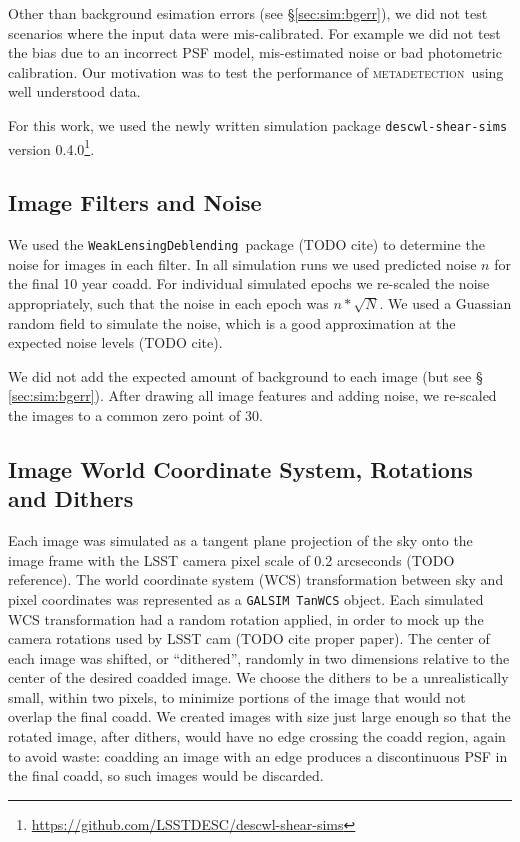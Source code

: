 \documentclass[iop, twocolappendix, appendixfloats, numberedappendix, apj]{hackemulateapj}
\newcommand{\descwl}{\texttt{WeakLensingDeblending}}
\newcommand{\galsim}{\texttt{GALSIM}}
\newcommand{\mdet}{\textsc{metadetection}}
\begin{document}
Other than background esimation errors (see \S \ref{sec:sim:bgerr}), we did not
test scenarios where the input data were mis-calibrated.  For example we did
not test the bias due to an incorrect PSF model, mis-estimated noise or bad
photometric calibration.  Our motivation was to test the performance of \mdet\
using well understood data.

For this work, we used the newly written simulation package
\texttt{descwl-shear-sims} version
0.4.0\footnote{\url{https://github.com/LSSTDESC/descwl-shear-sims}}.

\subsection{Image Filters and Noise} \label{sec:sim:noise}

We used the \descwl\ package (TODO cite) to determine the
noise for images in each filter.  In all simulation runs we used predicted
noise $n$ for the final 10 year coadd.  For individual simulated epochs we
re-scaled the noise appropriately, such that the noise in each epoch was $n *
\sqrt{N}$.  We used a Guassian random field to simulate the noise, which is a
good approximation at the expected noise levels (TODO cite).

We did not add the expected amount of background to each image (but see \S
\ref{sec:sim:bgerr}).  After drawing all image features and adding
noise, we re-scaled the images to a common zero point of 30.

\subsection{Image World Coordinate System, Rotations and Dithers} \label{sec:sim:rotdith}

Each image was simulated as a tangent plane projection of the sky onto the
image frame with the LSST camera pixel scale of 0.2 arcseconds (TODO reference).
The world coordinate system (WCS) transformation between sky and pixel
coordinates was represented as a \galsim\ \texttt{TanWCS} object.  Each
simulated WCS transformation had a random rotation applied, in order to mock up
the camera rotations used by LSST cam (TODO cite proper paper).  The center of
each image was shifted, or ``dithered'', randomly in two dimensions relative to
the center of the desired coadded image.  We choose the dithers to be a
unrealistically small, within two pixels, to minimize portions of the image
that would not overlap the final coadd.  We created images with size just large enough
so that the rotated image, after dithers, would have no edge crossing the coadd
region, again to avoid waste:  coadding an image with an edge produces a
discontinuous PSF in the final coadd, so such images would be discarded.
\end{document}
